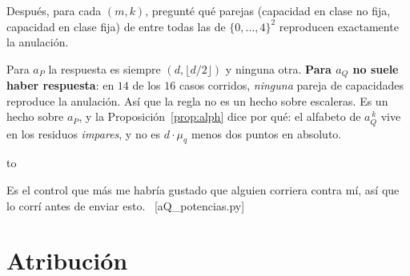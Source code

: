\documentclass[11pt,a4paper]{article}
\newcommand{\ver}[1]{\unskip\penalty0\ \textcolor{azul}{\small\textsf{[#1]}}}
\newenvironment{keybox}
  {\par\vspace{9pt}\begin{lrbox}{\fichabox}%
   \begin{minipage}{0.90\textwidth}\vspace{7pt}\setlength{\parskip}{3pt}}
  {\vspace{7pt}\end{minipage}\end{lrbox}%
   \par\noindent\hbox to \textwidth{\hfill
   \textcolor{azul}{\rule[-\dp\fichabox]{3.2pt}{\dimexpr\ht\fichabox+\dp\fichabox\relax}}%
   \colorbox{fondoficha}{\usebox{\fichabox}}\hfill}%
   \par\vspace{9pt}}
\begin{document}
Después, para cada $(m,k)$, pregunté qué parejas (capacidad en clase no fija, capacidad en clase
fija) de entre todas las de $\{0,\dots,4\}^2$ reproducen exactamente la anulación.

\begin{keybox}
Para $a_P$ la respuesta es siempre $(d,\lfloor d/2\rfloor)$ y ninguna otra. \textbf{Para $a_Q$ no
suele haber respuesta}: en $14$ de los $16$ casos corridos, \emph{ninguna} pareja de capacidades
reproduce la anulación. Así que la regla no es un hecho sobre escaleras. Es un hecho sobre $a_P$, y
la Proposición~\ref{prop:alph} dice por qué: el alfabeto de $a_Q^{\,k}$ vive en los residuos
\emph{impares}, y no es $d\cdot\mu_q$ menos dos puntos en absoluto.
\end{keybox}

\noindent Es el control que más me habría gustado que alguien corriera contra mí, así que lo corrí
antes de enviar esto. \ver{aQ\_potencias.py}


\section*{Atribución}\label{tab:attrib}
\end{document}

